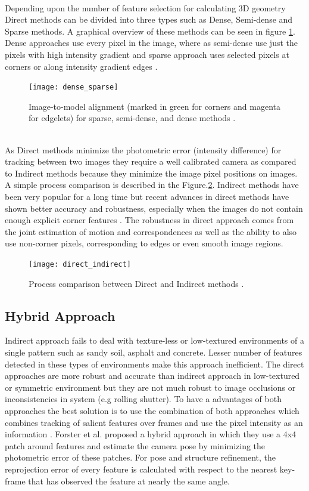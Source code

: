\\ 
Depending upon the number of feature selection for calculating 3D geometry Direct methods can be divided into three types such as Dense, Semi-dense and Sparse methods. A graphical overview of these methods can be seen in figure \ref{fig:dense_sparse}. Dense approaches use every pixel in the image, where as semi-dense use just the pixels with high intensity gradient and sparse approach uses selected pixels at corners or along intensity gradient edges \cite{engel14eccv}.
\newline
\begin{figure}[h]
	\centering
	\texttt{[image: dense\_sparse]}
	\caption{Image-to-model alignment (marked in green for corners and magenta for
		edgelets) for sparse, semi-dense, and dense methods \cite{7782863}.}
	\label{fig:dense_sparse}
\end{figure}
\\
As Direct methods minimize the photometric error (intensity difference) for tracking between two images they require a well calibrated camera as compared to Indirect methods because they minimize the image pixel positions on images. A simple process comparison is described in the Figure.\ref{fig:direct_indirect}. Indirect methods have been very popular for a long time but recent advances in direct methods have shown better accuracy and robustness, especially when the images do not contain enough explicit corner features \cite{Engel-et-al-pami2018}. The robustness in direct approach comes from the joint estimation of motion and correspondences as well as the ability to also use non-corner pixels, corresponding to edges or even smooth image regions\cite{gao2018ldso}.
\begin{figure}[h]
	\centering
	\texttt{[image: direct\_indirect]}
	\caption{Process comparison between Direct and Indirect methods \cite{engel14eccv}.}
	\label{fig:direct_indirect}
\end{figure}
\subsection{Hybrid Approach}
Indirect approach fails to deal with texture-less or low-textured environments of a single pattern such as sandy soil, asphalt and concrete. Lesser number of features detected in these types of environments make this approach inefficient. The direct approaches are more robust and accurate than indirect approach in low-textured or symmetric environment but they are not much robust to image occlusions or inconsistencies in system (e.g rolling shutter). To have a advantages of both approaches the best solution is to use the combination of both approaches which combines tracking of salient features over frames and use the pixel intensity as an information \cite{Aqel-et-al-2016}. Forster et al.\cite{7782863} proposed a hybrid approach in which they use a 4x4 patch around features and estimate the camera pose by minimizing the photometric error of these patches. For pose and structure refinement, the reprojection error of every feature is calculated with respect to the nearest key-frame that has observed the feature at nearly the same angle.

